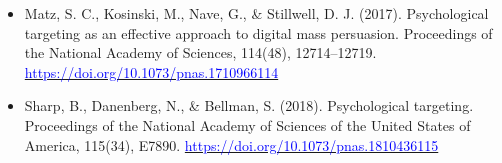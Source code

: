 \documentclass[aspectratio=169]{beamer}
\begin{document}
\begin{frame}
\begin{itemize}
        \item Matz, S. C., Kosinski, M., Nave, G., \& Stillwell, D. J. (2017). Psychological targeting as an effective approach to digital mass persuasion. Proceedings of the National Academy of Sciences, 114(48), 12714–12719. \href{https://doi.org/10.1073/pnas.1710966114}{\textcolor{blue}{https://doi.org/10.1073/pnas.1710966114}}
        \item Sharp, B., Danenberg, N., \& Bellman, S. (2018). Psychological targeting. Proceedings of the National Academy of Sciences of the United States of America, 115(34), E7890. \href{https://doi.org/10.1073/pnas.1810436115}{\textcolor{blue}{https://doi.org/10.1073/pnas.1810436115}}
    \end{itemize}
\end{frame}
\end{document}
